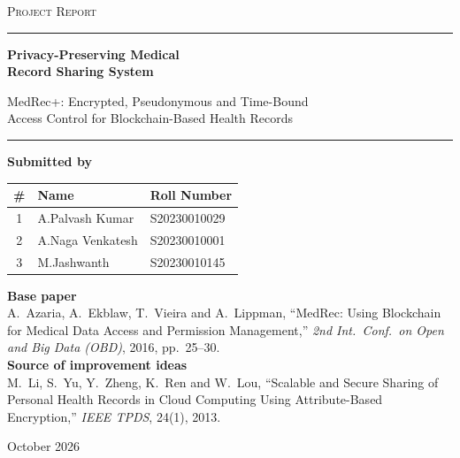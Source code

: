 \documentclass[11pt,a4paper]{article}
\begin{document}
\begin{titlepage}
\centering
\vspace*{1.2cm}

{\large\scshape Project Report\par}
\vspace{1.0cm}

{\color{plus}\rule{\linewidth}{1.2pt}\par}
\vspace{0.5cm}
{\Huge\bfseries Privacy-Preserving Medical\\[4pt] Record Sharing System\par}
\vspace{0.45cm}
{\Large MedRec+: Encrypted, Pseudonymous and Time-Bound\\ Access Control for Blockchain-Based Health Records\par}
\vspace{0.5cm}
{\color{plus}\rule{\linewidth}{1.2pt}\par}

\vspace{1.4cm}

{\large\bfseries Submitted by\par}
\vspace{0.4cm}
\begin{tabular}{@{}c l l@{}}
\toprule
\textbf{\#} & \textbf{Name} & \textbf{Roll Number} \\
\midrule
1 & A.Palvash Kumar & S20230010029 \\
2 & A.Naga Venkatesh & S20230010001 \\
3 & M.Jashwanth & S20230010145 \\
\bottomrule
\end{tabular}

\vspace{1.6cm}

\begin{minipage}{0.86\linewidth}
\centering\small
\textbf{Base paper}\\[3pt]
A.~Azaria, A.~Ekblaw, T.~Vieira and A.~Lippman,
``MedRec: Using Blockchain for Medical Data Access and Permission Management,''
\emph{2nd Int.\ Conf.\ on Open and Big Data (OBD)}, 2016, pp.~25--30.\\[8pt]
\textbf{Source of improvement ideas}\\[3pt]
M.~Li, S.~Yu, Y.~Zheng, K.~Ren and W.~Lou,
``Scalable and Secure Sharing of Personal Health Records in Cloud Computing
Using Attribute-Based Encryption,'' \emph{IEEE TPDS}, 24(1), 2013.
\end{minipage}

\vfill
{\large October 2026\par}
\end{titlepage}
\end{document}

